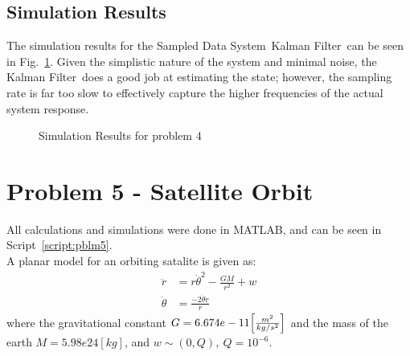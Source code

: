\documentclass[]{article}
\renewcommand{\lstlistingname}{Script}
\newcommand{\scriptname}{\lstlistingname}
\newcommand{\KF}{Kalman Filter}
\newcommand{\SDS}{Sampled Data System}
\renewcommand{\figurename}{Fig.}
\begin{document}
		
	\subsection{Simulation Results}
		The simulation results for the \SDS \ \KF \ can be seen in \figurename \ \ref{fig:pblm3results}. Given the simplistic nature of the system and minimal noise, the \KF \ does a good job at estimating the state; however, the sampling rate is far too slow to effectively capture the higher frequencies of the actual system response.
		
		\begin{figure}[p]
			\centering
			\caption{Simulation Results for problem 4}
			\label{fig:pblm3results}
		\end{figure}
		
		

\newpage
\section{Problem 5 - Satellite Orbit}
	All calculations and simulations were done in MATLAB, and can be seen in \scriptname \ \ref{script:pblm5}.\\
	
	A planar model for an orbiting satalite is given as:
	\begin{equation}
		\begin{aligned}
			\ddot{r} &= r \dot{\theta}^2 - \frac{G M}{r^2} + w\\
			\ddot{\theta} &= \frac{-2\dot{\theta}\dot{r}}{r}
		\end{aligned}
	\end{equation}
	where the gravitational constant $G = 6.674e-11 \qty[\frac{m^2}{kg/s^2}]$ and the mass of the earth $M = 5.98e24 [kg]$, and $w \sim (0,Q), \ Q = 10^{-6}$.
	
\end{document}
